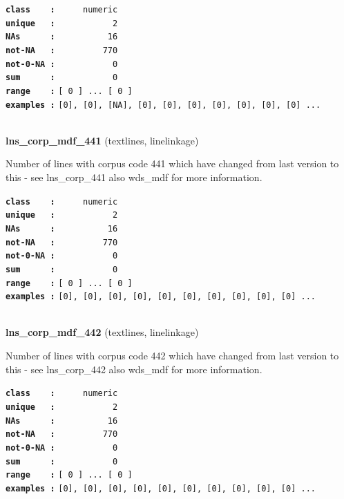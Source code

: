 \documentclass[]{article}
\begin{document}
\textbf{\texttt{class\ \ \ \ :}} \texttt{~~~~~numeric}\\
\textbf{\texttt{unique\ \ \ :}} \texttt{~~~~~~~~~~~2}\\
\textbf{\texttt{NAs\ \ \ \ \ \ :}} \texttt{~~~~~~~~~~16}\\
\textbf{\texttt{not-NA\ \ \ :}} \texttt{~~~~~~~~~770}\\
\textbf{\texttt{not-0-NA\ :}} \texttt{~~~~~~~~~~~0}\\
\textbf{\texttt{sum\ \ \ \ \ \ :}} \texttt{~~~~~~~~~~~0}\\
\textbf{\texttt{range\ \ \ \ :}}
\texttt{{[}\ 0\ {]}\ ...\ {[}\ 0\ {]}}\\
\textbf{\texttt{examples\ :}}
\texttt{{[}0{]},\ {[}0{]},\ {[}NA{]},\ {[}0{]},\ {[}0{]},\ {[}0{]},\ {[}0{]},\ {[}0{]},\ {[}0{]},\ {[}0{]}\ ...}\\

~

\textbf{lns\_corp\_mdf\_441} (textlines, linelinkage)

Number of lines with corpus code 441 which have changed from last
version to this - see lns\_corp\_441 also wds\_mdf for more information.

\textbf{\texttt{class\ \ \ \ :}} \texttt{~~~~~numeric}\\
\textbf{\texttt{unique\ \ \ :}} \texttt{~~~~~~~~~~~2}\\
\textbf{\texttt{NAs\ \ \ \ \ \ :}} \texttt{~~~~~~~~~~16}\\
\textbf{\texttt{not-NA\ \ \ :}} \texttt{~~~~~~~~~770}\\
\textbf{\texttt{not-0-NA\ :}} \texttt{~~~~~~~~~~~0}\\
\textbf{\texttt{sum\ \ \ \ \ \ :}} \texttt{~~~~~~~~~~~0}\\
\textbf{\texttt{range\ \ \ \ :}}
\texttt{{[}\ 0\ {]}\ ...\ {[}\ 0\ {]}}\\
\textbf{\texttt{examples\ :}}
\texttt{{[}0{]},\ {[}0{]},\ {[}0{]},\ {[}0{]},\ {[}0{]},\ {[}0{]},\ {[}0{]},\ {[}0{]},\ {[}0{]},\ {[}0{]}\ ...}\\

~

\textbf{lns\_corp\_mdf\_442} (textlines, linelinkage)

Number of lines with corpus code 442 which have changed from last
version to this - see lns\_corp\_442 also wds\_mdf for more information.

\textbf{\texttt{class\ \ \ \ :}} \texttt{~~~~~numeric}\\
\textbf{\texttt{unique\ \ \ :}} \texttt{~~~~~~~~~~~2}\\
\textbf{\texttt{NAs\ \ \ \ \ \ :}} \texttt{~~~~~~~~~~16}\\
\textbf{\texttt{not-NA\ \ \ :}} \texttt{~~~~~~~~~770}\\
\textbf{\texttt{not-0-NA\ :}} \texttt{~~~~~~~~~~~0}\\
\textbf{\texttt{sum\ \ \ \ \ \ :}} \texttt{~~~~~~~~~~~0}\\
\textbf{\texttt{range\ \ \ \ :}}
\texttt{{[}\ 0\ {]}\ ...\ {[}\ 0\ {]}}\\
\textbf{\texttt{examples\ :}}
\texttt{{[}0{]},\ {[}0{]},\ {[}0{]},\ {[}0{]},\ {[}0{]},\ {[}0{]},\ {[}0{]},\ {[}0{]},\ {[}0{]},\ {[}0{]}\ ...}\\
\end{document}
